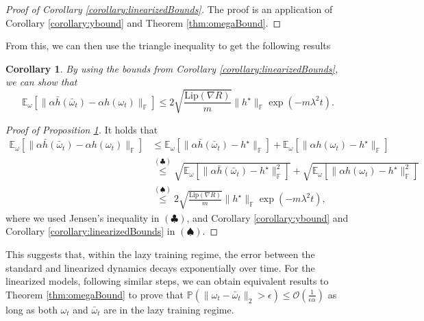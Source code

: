 \documentclass[10pt]{article} %
\newcommand{\bE}{\mathbb{E}}
\newcommand{\bF}{\mathbb{F}}
\newcommand{\bP}{\mathbb{P}}
\newcommand{\cO}{\mathcal{O}}
\newtheorem{corollary}{Corollary}
\begin{document}
\begin{proof}[Proof of Corollary \ref{corollary:linearizedBounds}]
    The proof is an application of Corollary \ref{corollary:ybound} and Theorem \ref{thm:omegaBound}.
\end{proof}
From this, we can then use the triangle inequality to get the following results
\begin{corollary}\label{prop:linearizedError}
    By using the bounds from Corollary \ref{corollary:linearizedBounds}, we can show that 
    \begin{equation*}
        \bE_\omega[\|\alpha \bar{h}(\bar{\omega}_t)-\alpha h(\omega_t)\|_\bF]\leq 2\sqrt{\frac{\mathrm{Lip}(\nabla R)}{m}}\|h^\star\|_\bF\exp(-m\lambda^2t).
    \end{equation*}
\end{corollary}
\begin{proof}[Proof of Proposition \ref{prop:linearizedError}]
    It holds that 
    \begin{align*}
        \bE_\omega[\|\alpha\bar{h}(\bar{\omega}_t)-\alpha h(\omega_t)\|_\bF]&\leq \bE_\omega[\|\alpha\bar{h}(\bar{\omega}_t)-h^\star\|_\bF]+\bE_\omega[\|\alpha h(\omega_t)-h^\star\|_\bF]\\
        &\overset{(\clubsuit)}{\leq} \sqrt{\bE_\omega[\|\alpha\bar{h}(\bar{\omega}_t)-h^\star\|_\bF^2]}+\sqrt{\bE_\omega[\|\alpha h(\omega_t)-h^\star\|_\bF^2]}\\
        &\overset{(\spadesuit)}{\leq} 2\sqrt{\frac{\mathrm{Lip}(\nabla R)}{m}}\|h^\star\|_\bF\exp(-m\lambda^2t),
    \end{align*}
    where we used Jensen's inequality in $(\clubsuit)$, and Corollary \ref{corollary:ybound} and Corollary \ref{corollary:linearizedBounds} in $(\spadesuit)$.
    
\end{proof}
This suggests that, within the lazy training regime, the error between the standard and linearized dynamics decays exponentially over time. For the linearized models, following similar steps, we can obtain equivalent results to Theorem \ref{thm:omegaBound} to prove that $\bP(\|\omega_t-\bar{\omega}_t\|_2>\epsilon)\leq \cO(\frac{1}{\epsilon \alpha})$ as long as both $\omega_t$ and $\bar{\omega}_t$ are in the lazy training regime.
    
\end{document}

